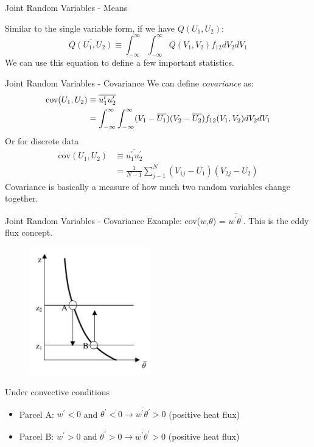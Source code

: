 
\begin{frame}{Joint Random Variables - Means}
  
  Similar to the single variable form, if we have $Q(U_1,U_2)$:
  $$\overline{Q(U_1,U_2)} \equiv \int^{\infty}_{-\infty} \int^{\infty}_{-\infty} Q(V_1,V_2)f_{12}dV_2dV_1$$
  We can use this equation to define a few important statistics.
  
\end{frame}


\begin{frame}{Joint Random Variables - Covariance}
  We can define \textit{covariance} as:
  \begin{align*}
  \text{cov}(U_1,U_2) &\equiv \newline \overline{u_1^\prime u_2^\prime} \\ &= \int^{\infty}_{-\infty} \int^{\infty}_{-\infty}(V_1 - \overline{U_1})(V_2 - \overline{U_2}) f_{12}(V_1,V_2)dV_2dV_1
  \end{align*}
  Or for discrete data
  \begin{align*}
  \text{cov}(U_1,U_2) &\equiv \overline{u_1^\prime u_2^\prime} \\ &= \frac{1}{N-1} \sum^N_{j-1} (V_{1j} - \overline{U_1})(V_{2j} - \overline{U_2})
  \end{align*}
  Covariance is basically a measure of how much two random variables change together.
\end{frame}


\begin{frame}{Joint Random Variables - Covariance}
  Example: cov($w$,$\theta$) = $\overline{w^\prime \theta^\prime}$. This is the eddy flux concept.
  \begin{figure}
  \includegraphics[width=0.47\textwidth]{flux.png}	
  \end{figure}
  Under convective conditions
	\begin{itemize}
		\item Parcel A: $w^{'} < 0$ and $\theta^{'} < 0 \rightarrow \overline{w^{'}\theta^{'}} > 0$ (positive heat flux)
		\item Parcel B: $w^{'} > 0$ and $\theta^{'} > 0 \rightarrow \overline{w^{'}\theta^{'}} > 0$ (positive heat flux)
	\end{itemize}
\end{frame}

